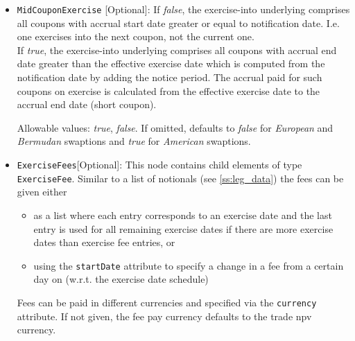 \begin{itemize}
\emph{PhysicalOTC} = OTC traded swaptions with physical settlement\\
\emph{PhysicalCleared} = Cleared swaptions with physical settlement\\
\emph{CollateralizedCashPrice} = Cash settled swaptions with settlement price calculation using zero coupon curve discounting \\
\emph{ParYieldCurve}  = Cash settled swaptions with settlement price calculation using par yield discounting \footnote{https://www.isda.org/book/2006-isda-definitions/} \footnote{https://www.isda.org/a/TlAEE/Supplement-No-58-to-ISDA-2006-Definitions.pdf} \\

\item \lstinline!MidCouponExercise! [Optional]:   If \emph{false}, the exercise-into underlying comprises all coupons with accrual start date greater or equal to notification date. I.e. one exercises into the next coupon, not the current one.\\
If \emph{true}, the exercise-into underlying 
comprises all coupons with accrual end date greater than the effective exercise date which is computed from the notification date by adding the notice period. 
The accrual paid for such coupons on exercise is calculated from the effective exercise date to the accrual end date (short coupon).

Allowable values: \emph{true}, \emph{false}. If omitted, defaults to \emph{false} for \emph{European} and \emph{Bermudan} swaptions and \emph{true} for \emph{American} swaptions.


\item \lstinline!ExerciseFees![Optional]: This node contains child elements of type \lstinline!ExerciseFee!. Similar to a list of notionals
  (see \ref{ss:leg_data}) the fees can be given either

  \begin{itemize}
  \item as a list where each entry corresponds to an exercise date and the last entry is used for all remaining exercise
    dates if there are more exercise dates than exercise fee entries, or
  \item using the \verb+startDate+ attribute to specify a change in a fee from a certain day on (w.r.t. the exercise
    date schedule)
  \end{itemize}

  Fees can be paid in different currencies and specified via the \verb+currency+ attribute. If not given, the fee pay
  currency defaults to the trade npv currency.


\end{itemize}

